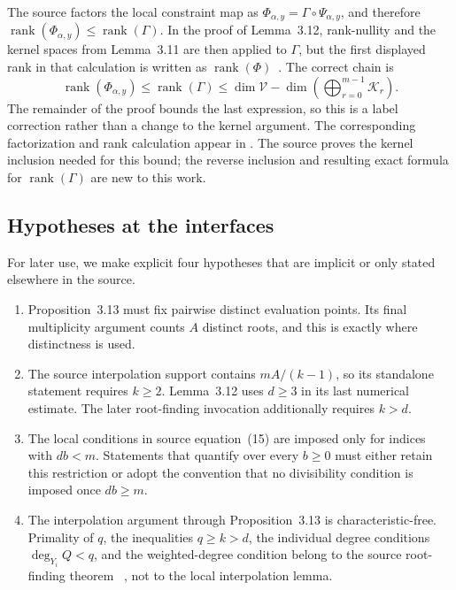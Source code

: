 \documentclass[11pt,letterpaper]{article}
\theoremstyle{definition}
\newcommand{\rank}{\operatorname{rank}}
\begin{document}
The source factors the local constraint map as
\(\Phi_{\alpha,y}=\Gamma\circ\Psi_{\alpha,y}\), and therefore
\(\rank(\Phi_{\alpha,y})\leq\rank(\Gamma)\).  In the proof of Lemma~3.12,
rank-nullity and the kernel spaces from Lemma~3.11 are then applied to
\(\Gamma\), but the first displayed rank in that calculation is written as
\(\rank(\Phi)\)~\cite[Section 3.2.2, equations (21)--(24)]{BCPZZ26}.  The
correct chain is
\begin{equation}
  \rank(\Phi_{\alpha,y})
  \leq\rank(\Gamma)
  \leq
  \dim\mathcal V-
  \dim\left(\bigoplus_{r=0}^{m-1}\mathcal K_r\right).
  \label{eq:source-phi-gamma-repair}
\end{equation}
The remainder of the proof bounds the last expression, so this is a label
correction rather than a change to the kernel argument.  The corresponding
factorization and rank calculation appear in
. The source proves the
kernel inclusion needed for this bound; the reverse inclusion and resulting
exact formula for \(\rank(\Gamma)\) are new to this work.

\subsection{Hypotheses at the interfaces}

For later use, we make explicit four hypotheses that are implicit or only
stated elsewhere in the source.

\begin{enumerate}[label=\textup{(\roman*)}]
  \item Proposition~3.13 must fix pairwise distinct evaluation points.  Its
        final multiplicity argument counts \(A\) distinct roots, and this is
        exactly where distinctness is used.
  \item The source interpolation support contains \(mA/(k-1)\), so its
        standalone statement requires \(k\geq2\).  Lemma~3.12 uses
        \(d\geq3\) in its last numerical estimate.  The later root-finding
        invocation additionally requires \(k>d\).
  \item The local conditions in source equation~(15) are imposed only for
        indices with \(db<m\).  Statements that quantify over every
        \(b\geq0\) must either retain this restriction or adopt the convention
        that no divisibility condition is imposed once \(db\geq m\).
  \item The interpolation argument through Proposition~3.13 is
        characteristic-free.  Primality of \(q\), the inequalities
        \(q\geq k>d\), the individual degree conditions
        \(\deg_{Y_i}Q<q\), and the weighted-degree condition belong to the
        source root-finding theorem
        ~\cite[Theorem 2.1]{BCPZZ26}, not to the local interpolation lemma.
\end{enumerate}
\end{document}
